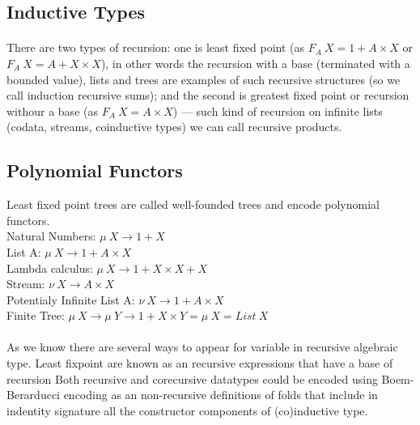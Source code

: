 \documentclass[11pt,oneside]{article}
\begin{document}
\newpage
\subsection{Inductive Types}

\paragraph{}
There are two types of recursion: one is least fixed point (as $F_A\ X = 1 + A\times X$
or $F_A\ X = A + X\times X$), in other words the recursion with a base (terminated with a bounded value),
lists and trees are examples of such recursive structures (so we call induction recursive sums);
and the second is greatest fixed point or recursion withour a base (as $F_A\ X = A\times X $) ---
such kind of recursion on infinite lists (codata, streams, coinductive types) we can call recursive products.\\

\subsection{Polynomial Functors}
Least fixed point trees are called well-founded trees and encode polynomial functors.\\

\noindent Natural Numbers: $\mu\ X \rightarrow 1 + X$\\
List A: $\mu\ X \rightarrow 1 + A \times X$\\
Lambda calculus: $\mu\ X \rightarrow 1 + X \times X + X$\\
Stream: $\nu\ X \rightarrow A \times X$\\
Potentialy Infinite List A: $\nu\ X \rightarrow 1 + A \times X$\\
Finite Tree: $\mu\ X \rightarrow \mu\ Y \rightarrow 1 + X \times Y = \mu\ X = List\ X$\\

\paragraph{}
As we know there are several ways to appear for variable in recursive algebraic type.
Least fixpoint are known as an recursive expressions that have a base of recursion
Both recursive and corecursive datatypes could be encoded using Boem-Berarducci encoding
as an non-recursive definitions of folds that include in indentity signature all the
constructor components of (co)inductive type.
\end{document}
